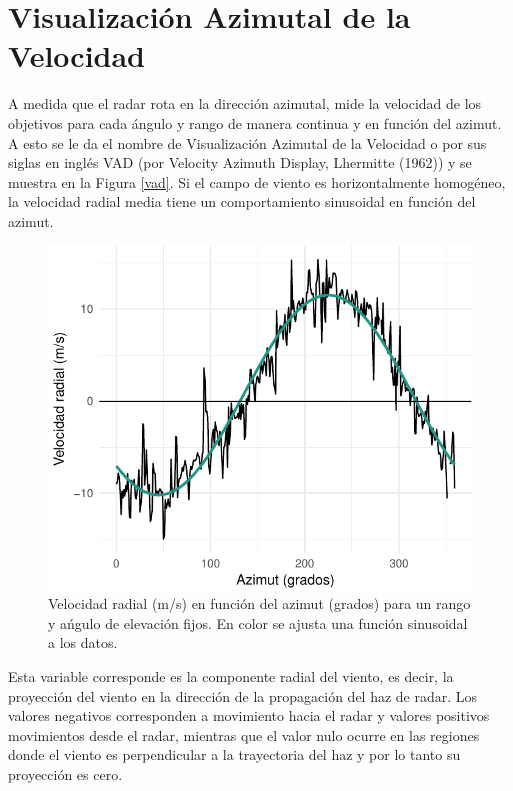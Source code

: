 \documentclass[12pt,spanish,oneside]{book}
\begin{document}
\section{\texorpdfstring{Visualización Azimutal de la Velocidad
\label{sec-vad}}{Visualización Azimutal de la Velocidad }}\label{visualizacion-azimutal-de-la-velocidad}

A medida que el radar rota en la dirección azimutal, mide la velocidad
de los objetivos para cada ángulo y rango de manera continua y en
función del azimut. A esto se le da el nombre de Visualización Azimutal
de la Velocidad o por sus siglas en inglés VAD (por Velocity Azimuth
Display, Lhermitte (1962)) y se muestra en la Figura \ref{vad}. Si el
campo de viento es horizontalmente homogéneo, la velocidad radial media
tiene un comportamiento sinusoidal en función del azimut.

\begin{figure}

{\centering \includegraphics{Tesis_files/figure-latex/vad-1} 

}

\caption{Velocidad radial (m/s) en función del azimut (grados) para un rango y ańgulo de elevación fijos. En color se  ajusta una función sinusoidal a los datos. \label{vad}}\label{fig:vad}
\end{figure}

Esta variable corresponde es la componente radial del viento, es decir,
la proyección del viento en la dirección de la propagación del haz de
radar. Los valores negativos corresponden a movimiento hacia el radar y
valores positivos movimientos desde el radar, mientras que el valor nulo
ocurre en las regiones donde el viento es perpendicular a la trayectoria
del haz y por lo tanto su proyección es cero.
\end{document}
